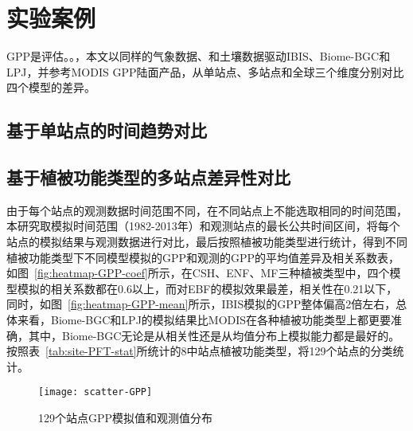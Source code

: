 \section{实验案例}
\label{sec:experiments}
GPP是评估。。，本文以同样的气象数据、和土壤数据驱动IBIS、Biome-BGC和LPJ，并参考MODIS GPP陆面产品，从单站点、多站点和全球三个维度分别对比四个模型的差异。
\subsection{基于单站点的时间趋势对比}


\subsection{基于植被功能类型的多站点差异性对比}
由于每个站点的观测数据时间范围不同，在不同站点上不能选取相同的时间范围，本研究取模拟时间范围（1982-2013年）和观测站点的最长公共时间区间，将每个站点的模拟结果与观测数据进行对比，最后按照植被功能类型进行统计，得到不同植被功能类型下不同模型模拟的GPP和观测的GPP的平均值差异及相关系数表，如图~\ref{fig:heatmap-GPP-coef}所示，在CSH、ENF、MF三种植被类型中，四个模型模拟的相关系数都在0.6以上，而对EBF的模拟效果最差，相关性在0.21以下，同时，如图~\ref{fig:heatmap-GPP-mean}所示，IBIS模拟的GPP整体偏高2倍左右，总体来看，Biome-BGC和LPJ的模拟结果比MODIS在各种植被功能类型上都更要准确，其中，Biome-BGC无论是从相关性还是从均值分布上模拟能力都是最好的。
按照表~\ref{tab:site-PFT-stat}所统计的8中站点植被功能类型，将129个站点的分类统计。

\begin{figure}[!htbp]
    \centering
    \texttt{[image: scatter-GPP]}
    \caption{129个站点GPP模拟值和观测值分布}
    \label{fig:api-gateway-children}
\end{figure}


